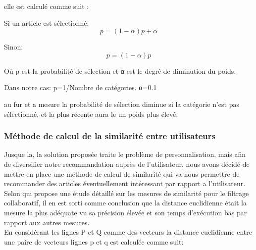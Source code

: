elle est calculé comme suit : 

Si un article est sélectionné:
                                   \[p = (1-{\alpha}) {p} + {\alpha}\]

Sinon: 
                                     \[{p} = (1-{\alpha}) {p}\]

Où p est la probabilité de sélection et α est le degré de diminution du poids.

Dans notre cas:
                                   p=1/Nombre de catégories.
                                   α=0.1

au fur et a mesure la probabilité de sélection diminue si la catégorie n'est pas sélectionné, et la plus récente aura le un poids plus élevé. 

	
		
		
		
			
		


\subsubsection{Méthode de calcul de la similarité entre utilisateurs}
Jusque la, la solution proposée traite le problème de personnalisation, mais afin de diversifier notre recommandation auprès de l'utilisateur, nous avons décidé de mettre en place une méthode de calcul de similarité qui va nous permettre de recommander des articles éventuellement intéressant par rapport a l'utilisateur. Selon \cite{collaborativeapachemahout} qui propose une étude détaillé sur les mesures de similarité pour le filtrage collaboratif, il en est sorti comme conclusion que la distance euclidienne était la mesure la plus adéquate vu sa précision élevée et son temps d'exécution bas par rapport aux autres mesures.\\
En considérant les lignes P et Q comme des vecteurs la distance euclidienne entre une paire de vecteurs lignes p et q est calculée comme suit:

